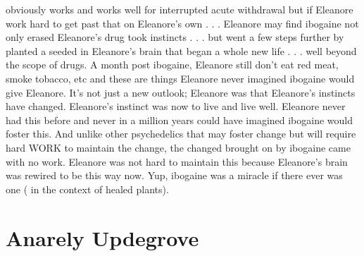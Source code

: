 \documentclass[12pt]{book}
\begin{document}
obviously works and works well for interrupted acute withdrawal but if Eleanore work hard to get past that on Eleanore's own . . .  Eleanore may find ibogaine not only erased Eleanore's drug took instincts . . .  but went a few steps further by planted a seeded in Eleanore's brain that began a whole new life . . .  well beyond the scope of drugs. A month post ibogaine, Eleanore still don't eat red meat, smoke tobacco, etc and these are things Eleanore never imagined ibogaine would give Eleanore. It's not just a new outlook; Eleanore was that Eleanore's instincts have changed. Eleanore's instinct was now to live and live well. Eleanore never had this before and never in a million years could have imagined ibogaine would foster this. And unlike other psychedelics that may foster change but will require hard WORK to maintain the change, the changed brought on by ibogaine came with no work. Eleanore was not hard to maintain this because Eleanore's brain was rewired to be this way now. Yup, ibogaine was a miracle if there ever was one ( in the context of healed plants).



\chapter{Anarely Updegrove}
\end{document}
